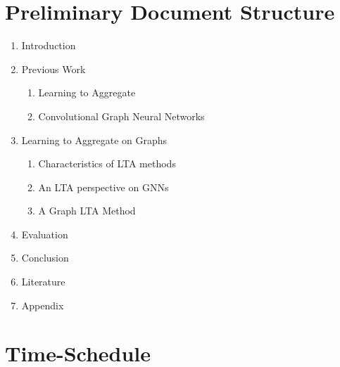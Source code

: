 \documentclass[12pt]{scrartcl}
\begin{document}
\section{Preliminary Document Structure}%
\label{sec:doc-structure}

\begin{enumerate}
	\item Introduction
	\item Previous Work
		\begin{enumerate}[label*=\arabic*.]
			\item Learning to Aggregate
			\item Convolutional Graph Neural Networks
		\end{enumerate}
	\item Learning to Aggregate on Graphs
	\begin{enumerate}[label*=\arabic*.]
		\item Characteristics of LTA methods
		\item An LTA perspective on GNNs
		\item A Graph LTA Method
	\end{enumerate}
	\item Evaluation
	\item Conclusion
	\item Literature
	\item Appendix
\end{enumerate}

\section{Time-Schedule}%
\label{sec:schedule}
\end{document}
